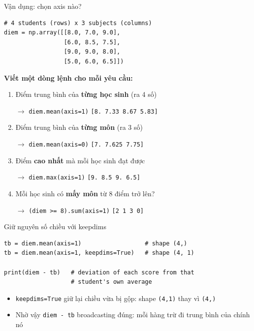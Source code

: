 \documentclass[11pt]{beamer}
\begin{document}
\begin{frame}[fragile]{Vận dụng: chọn axis nào?}
\begin{lstlisting}
# 4 students (rows) x 3 subjects (columns)
diem = np.array([[8.0, 7.0, 9.0],
                 [6.0, 8.5, 7.5],
                 [9.0, 9.0, 8.0],
                 [5.0, 6.0, 6.5]])
\end{lstlisting}
\textbf{Viết một dòng lệnh cho mỗi yêu cầu:}
\begin{enumerate}
  \item Điểm trung bình của \textbf{từng học sinh} (ra 4 số)
  \pause
  \par\smallskip
  \hspace*{1em}$\to$ \texttt{diem.mean(axis=1)} \; \texttt{[8. 7.33 8.67 5.83]}
  \pause
  \item Điểm trung bình của \textbf{từng môn} (ra 3 số)
  \pause
  \par\smallskip
  \hspace*{1em}$\to$ \texttt{diem.mean(axis=0)} \; \texttt{[7. 7.625 7.75]}
  \pause
  \item Điểm \textbf{cao nhất} mà mỗi học sinh đạt được
  \pause
  \par\smallskip
  \hspace*{1em}$\to$ \texttt{diem.max(axis=1)} \; \texttt{[9. 8.5 9. 6.5]}
  \pause
  \item Mỗi học sinh có \textbf{mấy môn} từ 8 điểm trở lên?
  \pause
  \par\smallskip
  \hspace*{1em}$\to$ \texttt{(diem >= 8).sum(axis=1)} \; \texttt{[2 1 3 0]}
\end{enumerate}
\end{frame}

\begin{frame}[fragile]{Giữ nguyên số chiều với keepdims}
\begin{lstlisting}
tb = diem.mean(axis=1)                  # shape (4,)
tb = diem.mean(axis=1, keepdims=True)   # shape (4, 1)

print(diem - tb)   # deviation of each score from that
                   # student's own average
\end{lstlisting}
\begin{itemize}
  \item \texttt{keepdims=True} giữ lại chiều vừa bị gộp: shape \texttt{(4,1)} thay vì \texttt{(4,)}
  \item Nhờ vậy \texttt{diem - tb} broadcasting đúng: mỗi hàng trừ đi trung bình của chính nó
\end{itemize}
\end{frame}
\end{document}
